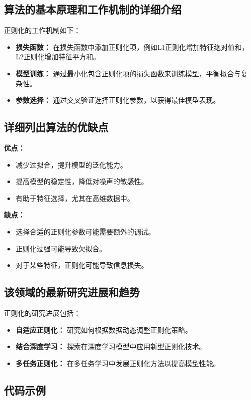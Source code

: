 \subsection*{算法的基本原理和工作机制的详细介绍}
正则化的工作机制如下：
\begin{itemize}
    \item \textbf{损失函数：} 在损失函数中添加正则化项，例如L1正则化增加特征绝对值和，L2正则化增加特征平方和。
    \item \textbf{模型训练：} 通过最小化包含正则化项的损失函数来训练模型，平衡拟合与复杂性。
    \item \textbf{参数选择：} 通过交叉验证选择正则化参数，以获得最佳模型表现。
\end{itemize}

\subsection*{详细列出算法的优缺点}
\textbf{优点：}
\begin{itemize}
    \item 减少过拟合，提升模型的泛化能力。
    \item 提高模型的稳定性，降低对噪声的敏感性。
    \item 有助于特征选择，尤其在高维数据中。
\end{itemize}

\textbf{缺点：}
\begin{itemize}
    \item 选择合适的正则化参数可能需要额外的调试。
    \item 正则化过强可能导致欠拟合。
    \item 对于某些特征，正则化可能导致信息损失。
\end{itemize}

\subsection*{该领域的最新研究进展和趋势}
正则化的研究进展包括：
\begin{itemize}
    \item \textbf{自适应正则化：} 研究如何根据数据动态调整正则化策略。
    \item \textbf{结合深度学习：} 探索在深度学习模型中应用新型正则化技术。
    \item \textbf{多任务正则化：} 在多任务学习中发展正则化方法以提高模型性能。
\end{itemize}
\subsection*{代码示例}
\begin{lstlisting}

\end{lstlisting}


